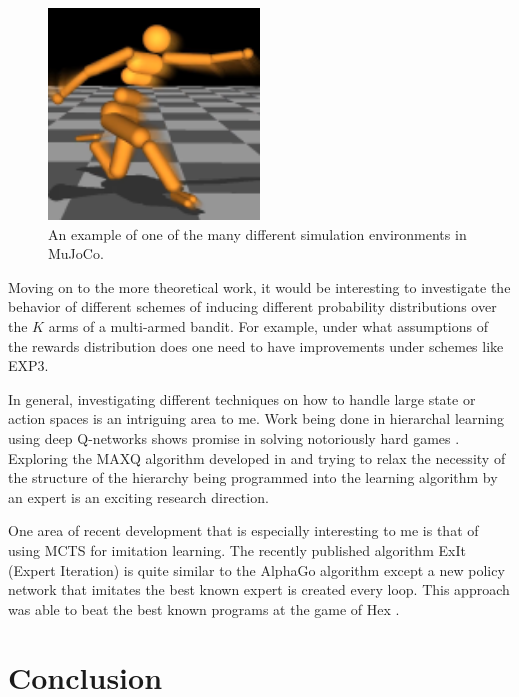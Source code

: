 \documentclass{article}
\begin{document}
  \begin{figure}[H]
    \centering
      \includegraphics[width=0.5\textwidth]{mujoco}
    \caption[Sample MuJoCo Environment]{An example of one of the many different simulation environments in MuJoCo.}
    \label{fig:mujoco}
  \end{figure}

  Moving on to the more theoretical work, it would be interesting to investigate the behavior of different schemes of inducing different probability distributions over the $K$ arms of a multi-armed bandit. For example, under what assumptions of the rewards distribution does one need to have improvements under schemes like EXP3.

  In general, investigating different techniques on how to handle large state or action spaces is an intriguing area to me. Work being done in hierarchal learning using deep Q-networks shows promise in solving notoriously hard games \cite{kulkarni_hierarchical_2016}. Exploring the MAXQ algorithm developed in \cite{dietterich_hierarchical_1999} and trying to relax the necessity of the structure of the hierarchy being programmed into the learning algorithm by an expert is an exciting research direction.

  One area of recent development that is especially interesting to me is that of using MCTS for imitation learning. The recently published algorithm ExIt (Expert Iteration) is quite similar to the AlphaGo algorithm except a new policy network that imitates the best known expert is created every loop. This approach was able to beat the best known programs at the game of Hex \cite{anthony_thinking_2017}.

  \section{Conclusion}
\end{document}
